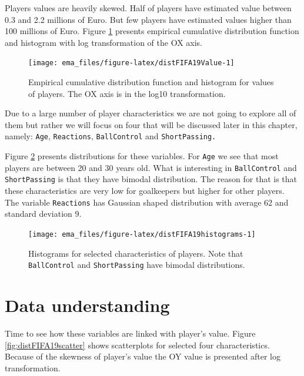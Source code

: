 \documentclass[]{krantz}
\begin{document}
Players values are heavily skewed. Half of players have estimated value between 0.3 and 2.2 millions of Euro. But few players have estimated values higher than 100 millions of Euro. Figure \ref{fig:distFIFA19Value} presents empirical cumulative distribution function and histogram with log transformation of the OX axis.

\begin{figure}

{\centering \texttt{[image: ema\_files/figure-latex/distFIFA19Value-1]} 

}

\caption{Empirical cumulative distribution function and histogram for values of players. The OX axis is in the log10 transformation.}\label{fig:distFIFA19Value}
\end{figure}

Due to a large number of player characteristics we are not going to explore all of them but rather we will focus on four that will be discussed later in this chapter, namely: \texttt{Age}, \texttt{Reactions}, \texttt{BallControl} and \texttt{ShortPassing.}

Figure \ref{fig:distFIFA19histograms} presents distributions for these variables. For \texttt{Age} we see that most players are between 20 and 30 years old. What is interesting in \texttt{BallControl} and \texttt{ShortPassing} is that they have bimodal distribution. The reason for that is that these characteristics are very low for goalkeepers but higher for other players. The variable \texttt{Reactions} has Gaussian shaped distribution with average 62 and standard deviation 9.



\begin{figure}

{\centering \texttt{[image: ema\_files/figure-latex/distFIFA19histograms-1]} 

}

\caption{Histograms for selected characteristics of players. Note that \texttt{BallControl} and \texttt{ShortPassing} have bimodal distributions.}\label{fig:distFIFA19histograms}
\end{figure}

\hypertarget{data-understanding}{%
\section{Data understanding}\label{data-understanding}}

Time to see how these variables are linked with player's value.
Figure \ref{fig:distFIFA19scatter} shows scatterplots for selected four characteristics. Because of the skewness of player's value the OY value is presented after log transformation.
\end{document}
